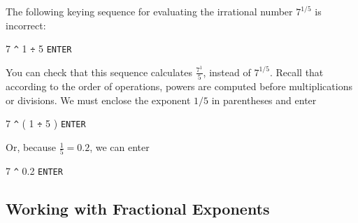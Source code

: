\documentclass[10pt,]{book}
\theoremstyle{plain}
\theoremstyle{definition}
\theoremstyle{definition}
\theoremstyle{definition}
\theoremstyle{definition}
\theoremstyle{definition}
\numberwithin{equation}{section}
\begin{document}
    The following keying sequence for evaluating the irrational number \(7^{1/5}\) is incorrect:
%
\par

    7 \lstinline?^? 1  \lstinline?÷? 5  \lstinline?ENTER?
%
\par

    You can check that this sequence calculates \(\frac{7^1}{5}\), instead of \(7^{1/5}\). Recall that according to the order of operations, powers are computed before multiplications or divisions. We must enclose the exponent \(1/5\) in parentheses and enter
%
\par

    7 \lstinline?^? ( 1 \lstinline?÷? 5 ) \lstinline?ENTER?   
%
\par

    Or, because \(\frac{1}{5}= 0.2\), we can enter
%
\par

    7 \lstinline?^? 0.2 \lstinline?ENTER?
%
\typeout{************************************************}
\typeout{************************************************}
\subsection[Working with Fractional Exponents]{Working with Fractional Exponents}\label{subsection-70}
\end{document}
